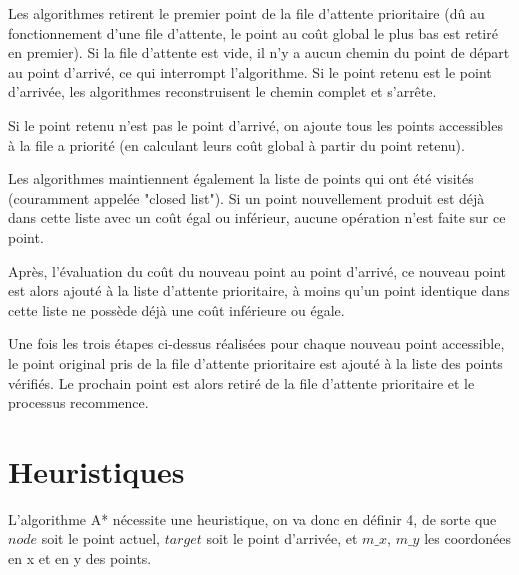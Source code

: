 \documentclass{report}
\begin{document}
Les algorithmes retirent le premier point de la file d'attente prioritaire (dû au fonctionnement d'une file d'attente, le point au coût global le plus bas est retiré en premier). Si la file d'attente est vide, il n'y a aucun chemin du point de départ au point d'arrivé, ce qui interrompt l'algorithme. Si le point retenu est le point d'arrivée, les algorithmes reconstruisent le chemin complet et s'arrête.

Si le point retenu n'est pas le point d'arrivé, on ajoute tous les points accessibles à la file a priorité (en calculant leurs coût global à partir du point retenu).

Les algorithmes maintiennent également la liste de points qui ont été visités (couramment appelée "closed list"). Si un point nouvellement produit est déjà dans cette liste avec un coût égal ou inférieur, aucune opération n'est faite sur ce point.

Après, l'évaluation du coût du nouveau point au point d'arrivé, ce nouveau point est alors ajouté à la liste d'attente prioritaire, à moins qu'un point identique dans cette liste ne possède déjà une coût inférieure ou égale.

Une fois les trois étapes ci-dessus réalisées pour chaque nouveau point accessible, le point original pris de la file d'attente prioritaire est ajouté à la liste des points vérifiés. Le prochain point est alors retiré de la file d'attente prioritaire et le processus recommence.
	
	\newpage
	\section{Heuristiques}
	L'algorithme A* nécessite une heuristique, on va donc en définir 4, de sorte que $node$ soit le point actuel, $target$ soit le point d'arrivée, et $m\_x$, $m\_y$ les coordonées en x et en y des points.\\
	
\end{document}
